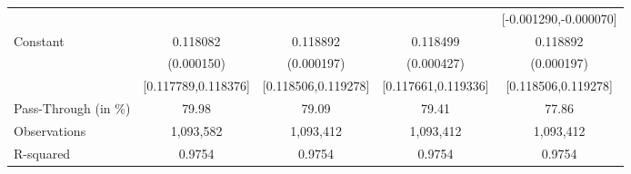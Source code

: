 {\begin{tabular}{l*{4}{c}}
                    &                     &                     &                     &[-0.001290,-0.000070]         \\
Constant            &    0.118082\sym{***}&    0.118892\sym{***}&    0.118499\sym{***}&    0.118892\sym{***}\\
                    &  (0.000150)         &  (0.000197)         &  (0.000427)         &  (0.000197)         \\
                    &[0.117789,0.118376]         &[0.118506,0.119278]         &[0.117661,0.119336]         &[0.118506,0.119278]         \\
\midrule
Pass-Through (in \%)&       79.98         &       79.09         &       79.41         &       77.86         \\
Observations        &   1,093,582         &   1,093,412         &   1,093,412         &   1,093,412         \\
R-squared           &      0.9754         &      0.9754         &      0.9754         &      0.9754         \\
\bottomrule
\end{tabular}
}
